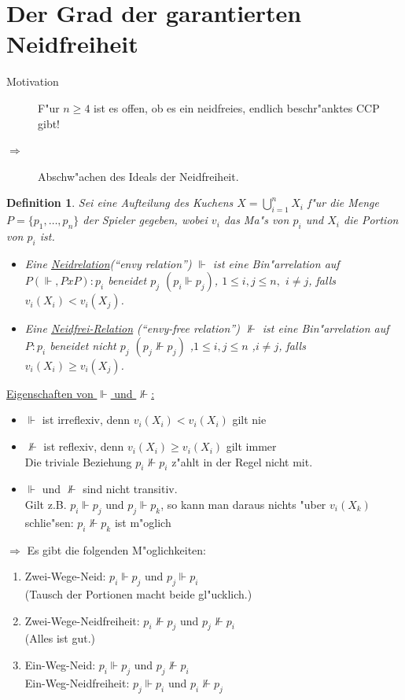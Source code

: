 \documentclass[11pt, a4paper, twoside]{article}
\newtheorem*{defi}{Definition}
\numberwithin{equation}{section}
\begin{document}
\section{Der Grad der garantierten Neidfreiheit}
\begin{description}
 \item[Motivation] F"ur $n\geq4$ ist es offen, ob es ein neidfreies, endlich beschr"anktes CCP gibt!
 \item[$\Rightarrow$] Abschw"achen des Ideals der Neidfreiheit. 
\end{description}
\begin{defi}
 Sei eine Aufteilung des Kuchens $X=\bigcup\limits_{i=1}^n X_i$ f"ur die Menge $P=\{p_1,\dots,p_n\}$ der Spieler gegeben, wobei $v_i$
 das Ma"s von $p_i$ und $X_i$ die Portion von $p_i$ ist.
 \begin{itemize}
  \item Eine \underline{Neidrelation}(``envy relation'') $\Vdash$ ist eine Bin"arrelation auf $P(\Vdash, PxP):p_i$ beneidet 
        $p_j$ $(p_i\Vdash p_j)$, $1\leq i,j\leq n,$ $i\neq j$, falls $v_i(X_i)<v_i(X_j)$.
  \item Eine \underline{Neidfrei-Relation} (``envy-free relation'') $\nVdash$ ist eine Bin"arrelation auf $P:p_i$ beneidet nicht $p_j$ $(p_j
        \nVdash p_j)$ ,$1\leq i,j\leq n$ ,$i\neq j$, falls $v_i(X_i)\geq v_i(X_j)$.
 \end{itemize}
\end{defi}
\underline{Eigenschaften von $\Vdash$ und $\nVdash$:}
\begin{itemize}
 \item $\Vdash$ ist irreflexiv, denn $v_i(X_i)<v_i(X_i)$ gilt nie
 \item $\nVdash$ ist reflexiv, denn $v_i(X_i)\geq v_i(X_i)$ gilt immer\\Die triviale Beziehung $p_i \nVdash p_i$ z"ahlt in der Regel nicht
       mit.
 \item $\Vdash$ und $\nVdash$ sind nicht transitiv.\\
       Gilt z.B. $p_i\Vdash p_j$ und $p_j\Vdash p_k$, so kann man daraus nichts "uber $v_i(X_k)$ schlie"sen: $p_i\nVdash p_k$ ist m"oglich
\end{itemize}
$\Rightarrow$ Es gibt die folgenden M"oglichkeiten:
\begin{enumerate}
 \item Zwei-Wege-Neid: $p_i\Vdash p_j$ und $p_j\Vdash p_i$\\(Tausch der Portionen macht beide gl"ucklich.)
 \item Zwei-Wege-Neidfreiheit: $p_i\nVdash p_j$ und $p_j\nVdash p_i$\\(Alles ist gut.)
 \item Ein-Weg-Neid: $p_i\Vdash p_j$ und $p_j\nVdash p_i$\\
       Ein-Weg-Neidfreiheit: $p_j\Vdash p_i$ und $p_i\nVdash p_j$
\end{enumerate}
\end{document}
